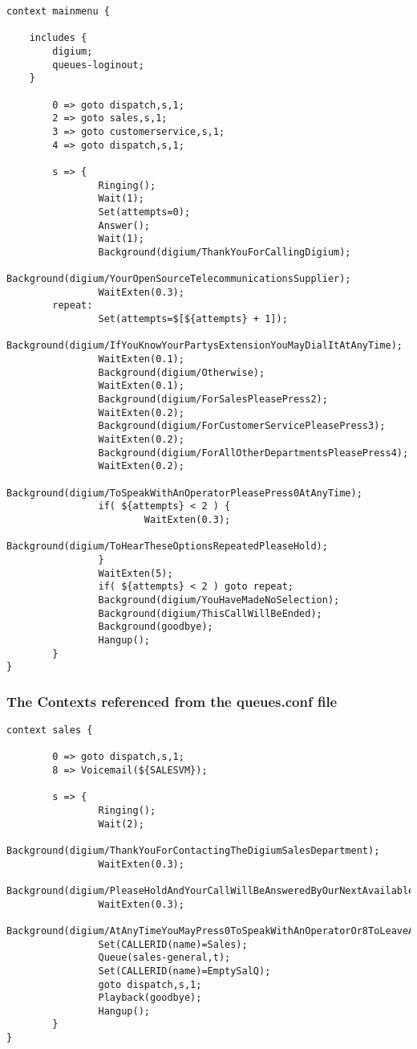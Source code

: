 \begin{astlisting}
\begin{verbatim}
context mainmenu {

	includes {
		digium;
		queues-loginout;
	}

        0 => goto dispatch,s,1;
        2 => goto sales,s,1;
        3 => goto customerservice,s,1;
        4 => goto dispatch,s,1;

        s => {
                Ringing();
                Wait(1);
                Set(attempts=0);
                Answer();
                Wait(1);
                Background(digium/ThankYouForCallingDigium);
                Background(digium/YourOpenSourceTelecommunicationsSupplier);
                WaitExten(0.3);
        repeat:
                Set(attempts=$[${attempts} + 1]);
                Background(digium/IfYouKnowYourPartysExtensionYouMayDialItAtAnyTime);
                WaitExten(0.1);
                Background(digium/Otherwise);
                WaitExten(0.1);
                Background(digium/ForSalesPleasePress2);
                WaitExten(0.2);
                Background(digium/ForCustomerServicePleasePress3);
                WaitExten(0.2);
                Background(digium/ForAllOtherDepartmentsPleasePress4);
                WaitExten(0.2);
                Background(digium/ToSpeakWithAnOperatorPleasePress0AtAnyTime);
                if( ${attempts} < 2 ) {
                        WaitExten(0.3);
                        Background(digium/ToHearTheseOptionsRepeatedPleaseHold);
                }
                WaitExten(5);
                if( ${attempts} < 2 ) goto repeat;
                Background(digium/YouHaveMadeNoSelection);
                Background(digium/ThisCallWillBeEnded);
                Background(goodbye);
                Hangup();
        }
}
\end{verbatim}
\end{astlisting}

\subsubsection{The Contexts referenced from the queues.conf file}

\begin{astlisting}
\begin{verbatim}
context sales {

        0 => goto dispatch,s,1;
        8 => Voicemail(${SALESVM});

        s => {
                Ringing();
                Wait(2);
                Background(digium/ThankYouForContactingTheDigiumSalesDepartment);
                WaitExten(0.3);
                Background(digium/PleaseHoldAndYourCallWillBeAnsweredByOurNextAvailableSalesRepresentative);
                WaitExten(0.3);
                Background(digium/AtAnyTimeYouMayPress0ToSpeakWithAnOperatorOr8ToLeaveAMessage);
                Set(CALLERID(name)=Sales);
                Queue(sales-general,t);
                Set(CALLERID(name)=EmptySalQ);
                goto dispatch,s,1;
                Playback(goodbye);
                Hangup();
        }
}
\end{verbatim}
\end{astlisting}


